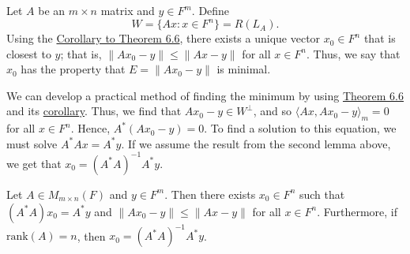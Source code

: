 Let \( A  \) be an \( m \times n  \) matrix and \( y \in F^{m} \). Define 
\[  W = \{ Ax: x \in F^{n} \} = R({L}_{A}).  \]
Using the {\hyperref[Corollary to Theorem 6.6]{Corollary to Theorem 6.6}}, there exists a unique vector \( {x}_{0} \in F^{n} \) that is closest to \( y  \); that is, \( \|{Ax}_{0} - y \| \leq \|Ax - y \| \) for all \( x \in F^{n} \). Thus, we say that \( {x}_{0}  \) has the property that \( E = \| {Ax}_{0} - y \|  \) is minimal. 

We can develop a practical method of finding the minimum by using {\hyperref[Theorem 6.6]{Theorem 6.6}} and its {\hyperref[Corollary to Theorem 6.6]{corollary}}. Thus, we find that 
\( {Ax}_{0} - y \in W^{\perp} \), and so \( \langle Ax  , {Ax}_{0} - y  \rangle_{m} = 0  \) for all \( x \in F^{n} \). Hence, \( A^{*}({Ax}_{0} - y) = 0  \). To find a solution to this equation, we must solve \( A^{*}Ax = A^{*} y  \). If we assume the result from the second lemma above, we get that \( {x}_{0} = (A^{*}A)^{-1} A^{*} y  \). 
\begin{theorem}
    Let \( A \in {M}_{m \times n}(F) \) and \( y \in F^{m} \). Then there exists \( {x}_{0} \in F^{n} \) such that \( (A^{*}A){x}_{0} = A^{*} y  \) and \( \| {Ax}_{0} - y \| \leq \| Ax - y \| \) for all \( x \in F^{n} \). Furthermore, if \( \text{rank}(A) = n  \), then \( {x}_{0} = (A^{*}A)^{-1} A^{*} y \).
\end{theorem}


